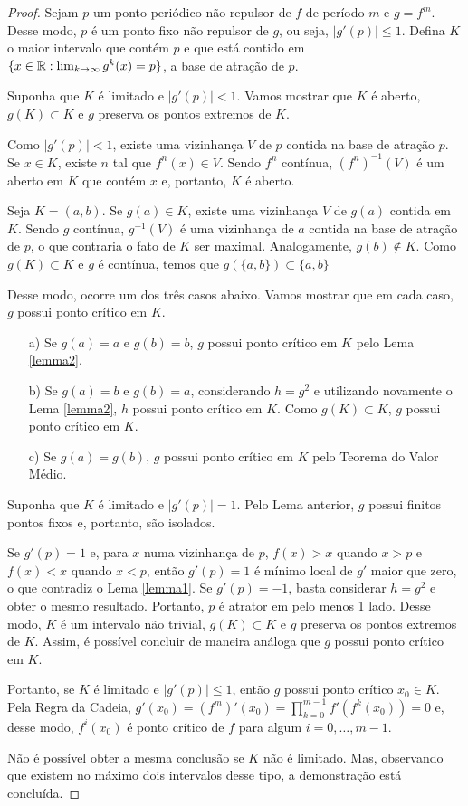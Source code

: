 \begin{proof}
Sejam $p$ um ponto periódico não repulsor de $f$ de período $m$ e $g = f^m$. Desse modo, $p$ é um ponto fixo não repulsor de $g$, ou seja, $|g'(p)| \leq 1$. Defina $K$ o maior intervalo que contém $p$ e que está contido em $\{ x \in \mathbb{R} : \lim_{k \to \infty} g^k(x) = p \}$, a base de atração de $p$.

Suponha que $K$ é limitado e $|g'(p)| < 1$. Vamos mostrar que $K$ é aberto, $g(K) \subset K$ e $g$ preserva os pontos extremos de $K$.

Como $|g'(p)| < 1$, existe uma vizinhança $V$ de $p$ contida na base de atração $p$. Se $x \in K$, existe $n$ tal que $f^n(x) \in V$. Sendo $f^n$ contínua, $(f^n)^{-1}(V)$ é um aberto em $K$ que contém $x$ e, portanto, $K$ é aberto.

Seja $K = (a, b)$. Se $g(a) \in K$, existe uma vizinhança $V$ de $g(a)$ contida em $K$. Sendo $g$ contínua, $g^{-1}(V)$ é uma vizinhança de $a$ contida na base de atração de $p$, o que contraria o fato de $K$ ser maximal. Analogamente, $g(b) \notin K$. Como $g(K) \subset K$ e $g$ é contínua, temos que $g(\{a, b\}) \subset \{a,b\}$

Desse modo, ocorre um dos três casos abaixo. Vamos mostrar que em cada caso, $g$ possui ponto crítico em $K$.

\begin{enumerate}
\item[a)] Se $g(a) = a$ e $g(b) = b$, $g$ possui ponto crítico em $K$ pelo Lema \ref{lemma2}.
\item[b)] Se $g(a) = b$ e $g(b) = a$,  considerando $h = g^2$ e utilizando novamente o Lema \ref{lemma2}, $h$ possui ponto crítico em $K$. Como $g(K) \subset K$, $g$ possui ponto crítico em $K$.
\item[c)] Se $g(a) = g(b)$, $g$ possui ponto crítico em $K$ pelo Teorema do Valor Médio.
\end{enumerate}

Suponha que $K$ é limitado e $|g'(p)| = 1$. Pelo Lema anterior, $g$ possui finitos pontos fixos e, portanto, são isolados.

Se $g'(p) = 1$ e, para $x$ numa vizinhança de $p$, $f(x) > x$ quando $x > p$ e $f(x) < x$ quando $x < p$, então $g'(p) = 1$ é mínimo local de $g'$ maior que zero, o que contradiz o Lema \ref{lemma1}. Se $g'(p)=-1$, basta considerar $h=g^2$ e obter o mesmo resultado. Portanto, $p$ é atrator em pelo menos 1 lado. Desse modo, $K$ é um intervalo não trivial, $g(K) \subset K$ e $g$ preserva os pontos extremos de $K$. Assim, é possível concluir de maneira análoga que $g$ possui ponto crítico em $K$.

Portanto, se $K$ é limitado e $|g'(p)| \leq 1$, então $g$ possui ponto crítico $x_0 \in K$. Pela Regra da Cadeia, $g'(x_0) = (f^m)'(x_0) = \prod_{k=0}^{m-1} f'(f^k(x_0)) = 0$ e, desse modo, $f^i(x_0)$ é ponto crítico de $f$ para algum $i = 0, \dots, m-1$.

Não é possível obter a mesma conclusão se $K$ não é limitado. Mas, observando que existem no máximo dois intervalos desse tipo, a demonstração está concluída.
\end{proof}

